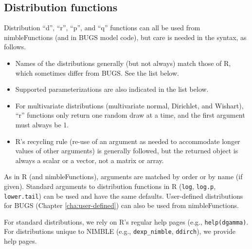 \documentclass[12pt,oneside]{book}\usepackage[]{graphicx}\usepackage[]{color}
\def\cd#1{\texttt{#1}}
\begin{document}
\subsection{Distribution functions}
\label{sec:nimble-dist-funs}

Distribution ``d'', ``r'', ``p'', and ``q'' functions can all be used
from nimbleFunctions (and in BUGS model code), but care is needed in the syntax, as follows.
\begin{itemize}
\item Names of the distributions generally (but not always) match those of R, which
  sometimes differ from BUGS.  See the list below.
\item Supported parameterizations are also indicated in the list below. 
  \item For multivariate distributions (multivariate normal,
    Dirichlet, and Wishart),  ``r'' functions only return one random
draw at a time, and the first argument must always be 1.
\item R's recycling rule (re-use of an argument as needed to accommodate
  longer values of other arguments) is generally followed, but the
  returned object is always a scalar or a vector, not a matrix or
  array.
\end{itemize}

As in R (and nimbleFunctions), arguments are matched by order or by name
(if given). Standard arguments to distribution functions in R
(\cd{log}, \cd{log.p}, \cd{lower.tail}) can be used and have the same
defaults. User-defined distributions for BUGS (Chapter
\ref{cha:user-defined}) can also be used from
nimbleFunctions. 

For standard distributions, we rely on R's regular help pages
(e.g., \cd{help(dgamma)}.  For distributions unique to NIMBLE
(e.g., \cd{dexp\_nimble}, \cd{ddirch}), we provide help pages.
\end{document}
